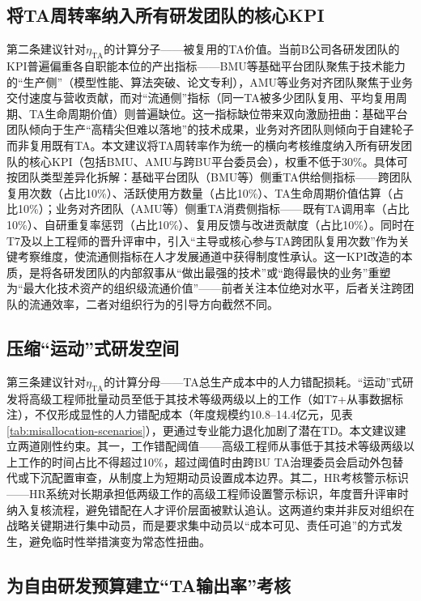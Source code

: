 \subsection{将TA周转率纳入所有研发团队的核心KPI}
\label{subsec:ta-kpi}

第二条建议针对$\eta_{\mathrm{TA}}$的计算分子——被复用的TA价值。当前B公司各研发团队的KPI普遍偏重各自职能本位的产出指标——BMU等基础平台团队聚焦于技术能力的“生产侧”（模型性能、算法突破、论文专利），AMU等业务对齐团队聚焦于业务交付速度与营收贡献，而对“流通侧”指标（同一TA被多少团队复用、平均复用周期、TA生命周期价值）则普遍缺位。这一指标缺位带来双向激励扭曲：基础平台团队倾向于生产“高精尖但难以落地”的技术成果，业务对齐团队则倾向于自建轮子而非复用既有TA。本文建议将TA周转率作为统一的横向考核维度纳入所有研发团队的核心KPI（包括BMU、AMU与跨BU平台委员会），权重不低于30\%。具体可按团队类型差异化拆解：基础平台团队（BMU等）侧重TA供给侧指标——跨团队复用次数（占比10\%）、活跃使用方数量（占比10\%）、TA生命周期价值估算（占比10\%）；业务对齐团队（AMU等）侧重TA消费侧指标——既有TA调用率（占比10\%）、自研重复率惩罚（占比10\%）、复用反馈与改进贡献度（占比10\%）。同时在T7及以上工程师的晋升评审中，引入“主导或核心参与TA跨团队复用次数”作为关键考察维度，使流通侧指标在人才发展通道中获得制度性承认。这一KPI改造的本质，是将各研发团队的内部叙事从“做出最强的技术”或“跑得最快的业务”重塑为“最大化技术资产的组织级流通价值”——前者关注本位绝对水平，后者关注跨团队的流通效率，二者对组织行为的引导方向截然不同。

\subsection{压缩“运动”式研发空间}
\label{subsec:campaign-constraint}

第三条建议针对$\eta_{\mathrm{TA}}$的计算分母——TA总生产成本中的人力错配损耗。“运动”式研发将高级工程师批量动员至低于其技术等级两级以上的工作（如T7+从事数据标注），不仅形成显性的人力错配成本（年度规模约10.8--14.4亿元，见表\ref{tab:misallocation-scenarios}），更通过专业能力退化加剧了潜在TD。本文建议建立两道刚性约束。其一，工作错配阈值——高级工程师从事低于其技术等级两级以上工作的时间占比不得超过10\%，超过阈值时由跨BU TA治理委员会启动外包替代或下沉配置审查，从制度上为短期动员设置成本边界。其二，HR考核警示标识——HR系统对长期承担低两级工作的高级工程师设置警示标识，年度晋升评审时纳入复核流程，避免错配在人才评价层面被默认追认。这两道约束并非反对组织在战略关键期进行集中动员，而是要求集中动员以“成本可见、责任可追”的方式发生，避免临时性举措演变为常态性扭曲。

\subsection{为自由研发预算建立“TA输出率”考核}
\label{subsec:free-budget}

